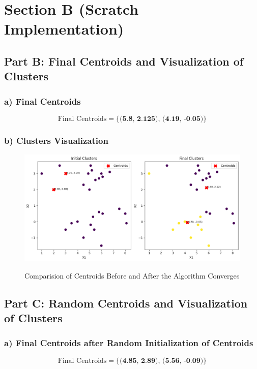 \documentclass{article}
\begin{document}
\vspace{10pt} %
\section{Section B (Scratch Implementation)}
\subsection*{Part B: Final Centroids and Visualization of Clusters}
\subsubsection*{a) Final Centroids}
\[
\text{Final Centroids} = \{\textbf{(5.8, 2.125), (4.19, -0.05)}\}
\]
\subsubsection*{b) Clusters Visualization}
\begin{figure}[H] %
    \centering
    \begin{minipage}{1\linewidth}
        \centering
        \includegraphics[scale=0.4]{assets/b.png}
        \caption{Comparision of Centroids Before and After the Algorithm Converges}{}
        \label{fig:1c}
    \end{minipage}
\end{figure}

\subsection*{Part C: Random Centroids and Visualization of Clusters}
\subsubsection*{a) Final Centroids after Random Initialization of Centroids}
\[
\text{Final Centroids} = \{\textbf{(4.85, 2.89), (5.56, -0.09)}\}
\]
\end{document}
